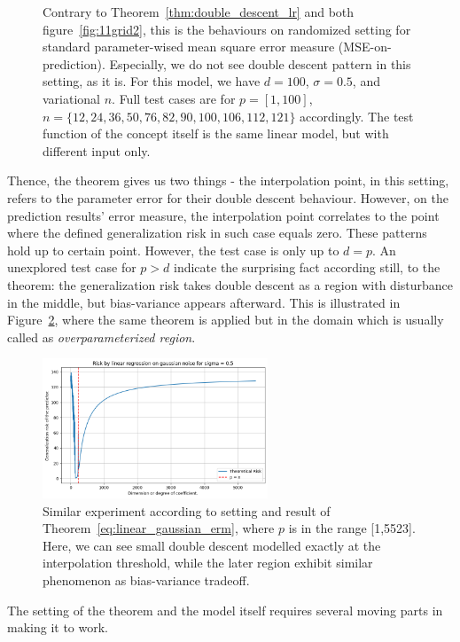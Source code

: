 \documentclass{article}
\begin{document}
\begin{figure}[htb]
  \caption{Contrary to Theorem~\ref{thm:double_descent_lr} and both figure~\ref{fig:11grid2}, this is the behaviours on randomized setting for standard parameter-wised mean square error measure (MSE-on-prediction). Especially, we do not see double descent pattern in this setting, as it is. For this model, we have $d=100$, $\sigma = 0.5$, and variational $n$. Full test cases are for $p=[1,100]$, $n=\{12,24,36,50,76,82,90,100,106,112,121\}$ accordingly. The test function of the concept itself is the same linear model, but with different input only.}
  \label{fig:11grid21}
\end{figure}

Thence, the theorem gives us two things - the interpolation point, in this setting, refers to the parameter error for their double descent behaviour. However, on the prediction results' error measure, the interpolation point correlates to the point where the defined generalization risk in such case equals zero. These patterns hold up to certain point. However, the test case is only up to $d=p$. An unexplored test case for $p>d$ indicate the surprising fact according still, to the theorem: the generalization risk takes double descent as a region with disturbance in the middle, but bias-variance appears afterward. This is illustrated in Figure~\ref{fig:contrarian}, where the same theorem is applied but in the domain which is usually called as \textit{overparameterized region}. 
\begin{figure}[htp]
  \centering
  \includegraphics[width=0.6\textwidth]{img/dimensional_descent.png}
  \caption{Similar experiment according to setting and result of Theorem~\ref{eq:linear_gaussian_erm}, where $p$ is in the range [1,5523]. Here, we can see small double descent modelled exactly at the interpolation threshold, while the later region exhibit similar phenomenon as bias-variance tradeoff.}
  \label{fig:contrarian}
\end{figure}

The setting of the theorem and the model itself requires several moving parts in making it to work. 
\end{document}
